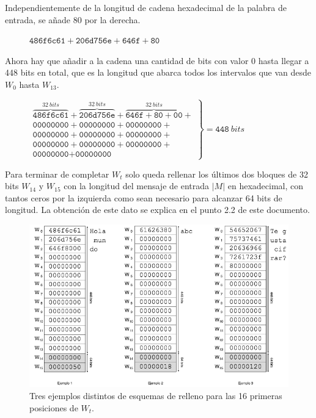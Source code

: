 \documentclass{article}
\begin{document}
        Independientemente de la longitud de cadena hexadecimal de la palabra de entrada, se añade $80$ por la derecha.
            \begin{figure}[H]
            \centering
                $\texttt{486f6c61} + \texttt{206d756e} + \texttt{646f} + \texttt{80}$
            \end{figure}
        
        Ahora hay que añadir a la cadena una cantidad de bits con valor $0$ hasta llegar a 448 bits en total, que es la longitud que abarca todos los intervalos que van desde $W_{0}$ hasta $W_{13}$.
            \begin{figure}[H]
            \centering
                $\left .
                \begin{array}{l}
                    \overbrace{\texttt{486f6c61}}^{32 \ bits}+\overbrace{\texttt{206d756e}}^{32 \ bits}+\overbrace{\texttt{646f} + \texttt{80} + \texttt{00}}^{32 \ bits}+ \\
                    \texttt{00000000}+\texttt{00000000}+\texttt{00000000}+ \\
                    \texttt{00000000}+\texttt{00000000}+\texttt{00000000}+ \\
                    \texttt{00000000}+\texttt{00000000}+\texttt{00000000}+ \\
                    \texttt{00000000}+\texttt{00000000}
                \end{array}
                \right \} = \texttt{448} \ bits$
            \end{figure}

        Para terminar de completar $W_{t}$ solo queda rellenar los últimos dos bloques de 32 bits $W_{14}$ y $W_{15}$ con la longitud del mensaje de entrada $|M|$ en hexadecimal, con tantos ceros por la izquierda como sean necesario para alcanzar 64 bits de longitud. La obtención de este dato se explica en el punto 2.2 de este documento.
            \begin{figure}[H]
            \centering
                \includegraphics[scale=0.49]{img/SHA-256-W0-W15}
                \caption{Tres ejemplos distintos de esquemas de relleno para las 16 primeras posiciones de $W_{t}$.}
            \end{figure}
    
\end{document}
